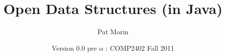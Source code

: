 \documentclass[11pt]{book}
\title{Open Data Structures (in Java)}
\author{Pat Morin}
\date{Version 0.0 pre $\alpha$ : COMP2402 Fall 2011}
\begin{document}
\begin{titlepage}
  \maketitle
\end{titlepage}

\ \thispagestyle{empty}\newpage

\setcounter{page}{1}
%

\tableofcontents













%



\end{document}
